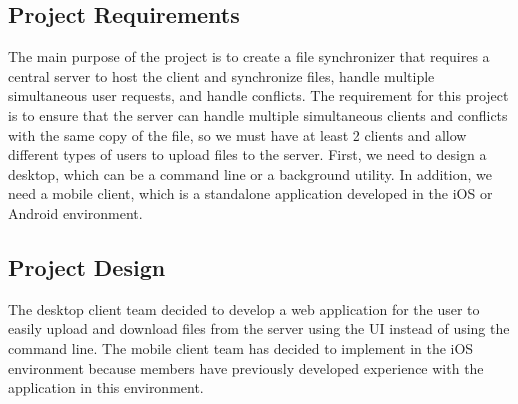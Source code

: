 \subsection{Project Requirements}
\noindent The main purpose of the project is to create a file synchronizer that requires a central server to host the client and synchronize files, handle multiple simultaneous user requests, and handle conflicts. The requirement for this project is to ensure that the server can handle multiple simultaneous clients and conflicts with the same copy of the file, so we must have at least 2 clients and allow different types of users to upload files to the server. First, we need to design a desktop, which can be a command line or a background utility. In addition, we need a mobile client, which is a standalone application developed in the iOS or Android environment.




\begin{comment}
\noindent As our main task is to develop a multi-host file synchroniser,In summary, the function of this synchronizer is to make it possible to edit the same files across multiple computers in a sensible way. This synchroniser can satisfy the multiple clients access and edit the data in a single central server. In this group project, our final result is to develop a server and two clients, one for desktop and another for mobile.the function of this synchronizer is to make it possible to edit the same files across multiple computers in a sensible way. This synchroniser can satisfy the multiple clients access and edit the data in a single central server. In this group project, our final result is to develop a server and two clients, one for desktop and another for mobile.
\end{comment}



\subsection{Project Design}
\noindent The desktop client team decided to develop a web application for the user to easily upload and download files from the server using the UI instead of using the command line.
The mobile client team has decided to implement in the iOS environment because members have previously developed experience with the application in this environment.